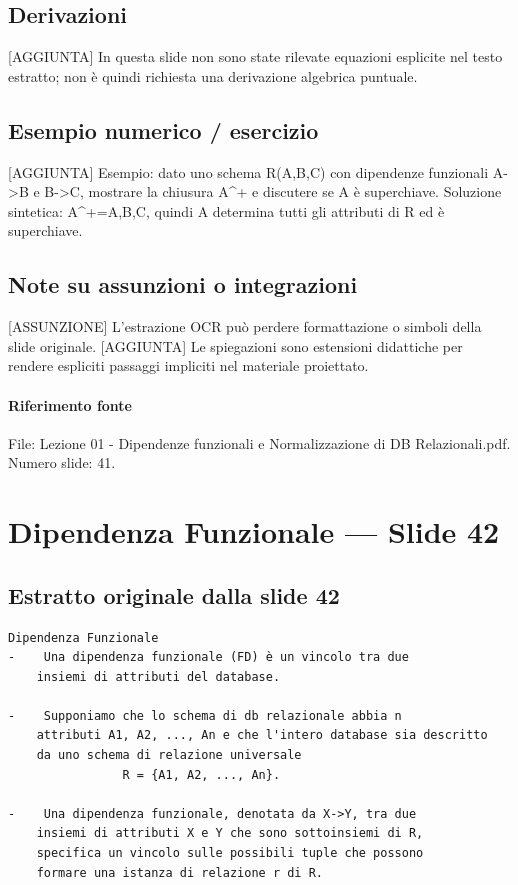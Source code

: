 \documentclass[11pt]{article}
\begin{document}
\subsection*{Derivazioni}
[AGGIUNTA] In questa slide non sono state rilevate equazioni esplicite nel testo estratto; non è quindi richiesta una derivazione algebrica puntuale.
\subsection*{Esempio numerico / esercizio}
[AGGIUNTA] Esempio: dato uno schema R(A,B,C) con dipendenze funzionali A->B e B->C, mostrare la chiusura A^+ e discutere se A è superchiave. Soluzione sintetica: A^+={A,B,C}, quindi A determina tutti gli attributi di R ed è superchiave.
\subsection*{Note su assunzioni o integrazioni}
[ASSUNZIONE] L'estrazione OCR può perdere formattazione o simboli della slide originale.
[AGGIUNTA] Le spiegazioni sono estensioni didattiche per rendere espliciti passaggi impliciti nel materiale proiettato.
\paragraph{Riferimento fonte} File: Lezione 01 - Dipendenze funzionali e Normalizzazione di DB Relazionali.pdf. Numero slide: 41.
\section{Dipendenza Funzionale --- Slide 42}
\subsection*{Estratto originale dalla slide 42}
\begin{lstlisting}
Dipendenza Funzionale
-    Una dipendenza funzionale (FD) è un vincolo tra due
    insiemi di attributi del database.

-    Supponiamo che lo schema di db relazionale abbia n
    attributi A1, A2, ..., An e che l'intero database sia descritto
    da uno schema di relazione universale
                R = {A1, A2, ..., An}.

-    Una dipendenza funzionale, denotata da X->Y, tra due
    insiemi di attributi X e Y che sono sottoinsiemi di R,
    specifica un vincolo sulle possibili tuple che possono
    formare una istanza di relazione r di R.
\end{lstlisting}
\end{document}
